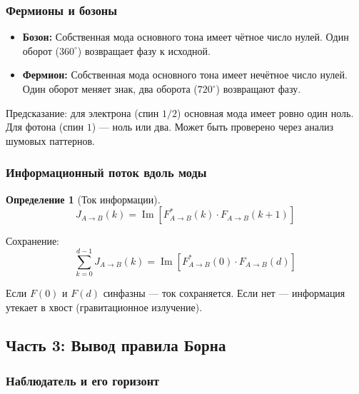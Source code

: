 \documentclass[12pt,a4paper]{article}
\newtheorem{definition}{Определение}[section]
\begin{document}
\subsubsection{Фермионы и бозоны}

\begin{itemize}
    \item \textbf{Бозон:} Собственная мода основного тона имеет чётное число нулей. Один оборот ($360^\circ$) возвращает фазу к исходной.
    \item \textbf{Фермион:} Собственная мода основного тона имеет нечётное число нулей. Один оборот меняет знак, два оборота ($720^\circ$) возвращают фазу.
\end{itemize}

Предсказание: для электрона (спин $1/2$) основная мода имеет ровно один ноль. Для фотона (спин $1$) --- ноль или два. Может быть проверено через анализ шумовых паттернов.

\subsubsection{Информационный поток вдоль моды}

\begin{definition}[Ток информации]
\begin{equation}
    J_{A \to B}(k) = \operatorname{Im}\left[ F_{A \to B}^*(k) \cdot F_{A \to B}(k+1) \right]
\end{equation}
\end{definition}

Сохранение:
\begin{equation}
    \sum_{k=0}^{d-1} J_{A \to B}(k) = \operatorname{Im}\left[ F_{A \to B}^*(0) \cdot F_{A \to B}(d) \right]
\end{equation}

Если $F(0)$ и $F(d)$ синфазны --- ток сохраняется. Если нет --- информация утекает в хвост (гравитационное излучение).

\subsection{Часть 3: Вывод правила Борна}

\subsubsection{Наблюдатель и его горизонт}
\end{document}
